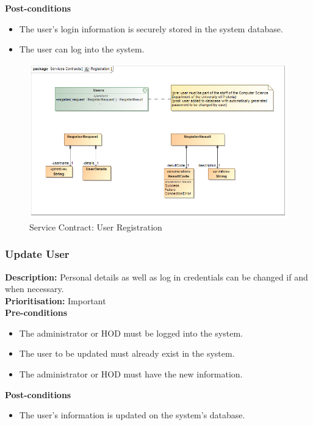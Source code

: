 \documentclass[a4paper]{article}
\begin{document}
    \textbf{Post-conditions}
    \begin{itemize}
        \item The user's login information is securely stored in the system database.
        \item The user can log into the system.
    \end{itemize}
    
    	\begin{figure}[H]
    		\centering
    		\includegraphics[width=\textwidth]{5.1.2.Registration.Services.Contract.png}
    		\caption{Service Contract: User Registration}
    	\end{figure}
    
    
    \pagebreak
    \subsubsection{Update User}
   
    \textbf{Description:} Personal details as well as log in credentials can be changed if and when necessary.\\
     \textbf{Prioritisation:} Important\\
     
    \textbf{Pre-conditions}
     \begin{itemize}
        \item The administrator or HOD must be logged into the system.
        \item The user to be updated must already exist in the system.
        \item The administrator or HOD must have the new information.
   \end{itemize}
    
    \textbf{Post-conditions}
    \begin{itemize}
        \item The user's information is updated on the system's database.
    \end{itemize}
    
\end{document}
